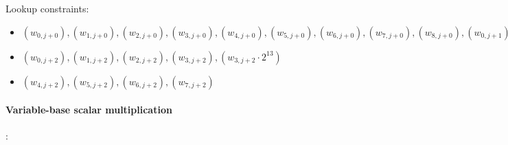 Lookup constraints:
\begin{itemize}
\item $(w_{0, j + 0}), (w_{1, j + 0}), (w_{2, j + 0}), (w_{3, j + 0}), (w_{4, j + 0}), (w_{5, j + 0}), (w_{6, j + 0}), (w_{7, j + 0}), (w_{8, j + 0}), (w_{0, j + 1}), (w_{1, j + 1}), (w_{2, j + 1}), (w_{3, j + 1}, w_{6, j + 1}), (w_{3, j + 1} \cdot 2^{7})$
\item $(w_{0, j + 2}), (w_{1, j + 2}), (w_{2, j + 2}), (w_{3, j + 2}),(w_{3, j + 2} \cdot 2^{13})$
\item $(w_{4, j + 2}), (w_{5, j + 2}), (w_{6, j + 2}), (w_{7, j + 2})$
\end{itemize}

\paragraph{Variable-base scalar multiplication}:

